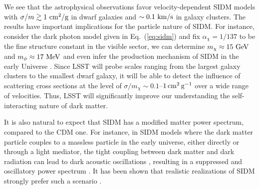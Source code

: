 We see that the astrophysical observations favor velocity-dependent SIDM models with $\sigma/m\gtrsim 1~{\rm cm^2/g}$ in dwarf galaxies and $\sim0.1~{\rm km/s}$ in galaxy clusters. The results have important implications for the particle nature of SIDM. For instance, consider the dark photon model given in Eq.~(\ref{eq:sidm}) and fix $\alpha_\chi=1/137$ to be the fine structure constant in the visible sector, we can determine $m_\chi\approx15~{\rm GeV}$ and $m_\phi\approx17~{\rm MeV}$ \citep{Kaplinghat:2015aga} and even infer the production mechanism of SIDM in the early Universe \citep{Huo:2017vef}. Since LSST will probe scales ranging from the largest galaxy clusters to the smallest dwarf galaxy, it will be able to detect the influence of scattering cross sections at the level of $\sigma/m_\chi \sim 0.1$--$1 \mathrm{\,cm}^2 \mathrm{\,g}^{-1}$ over a wide range of velocities. Thus, LSST will significantly improve our understanding the self-interacting nature of dark matter. 







It is also natural to expect that SIDM has a modified matter power spectrum, compared to the CDM one. For instance, in SIDM models where the dark matter particle couples to a massless particle in the early universe, either directly or through a light mediator, the tight coupling between dark matter and dark radiation can lead to dark acoustic oscillations \citep{Cyr-Racine:2013ab,Cyr-Racine:2013fsa}, resulting in a suppressed and oscillatory power spectrum \citep[\eg][]{1992ApJ...398...43C,Boehm:2001hm,Boehm:2004th,Feng:2009mn,Aarssen:2012fx}. It has been shown that realistic realizations of SIDM strongly prefer such a scenario \citep{ Huo:2017vef}.

